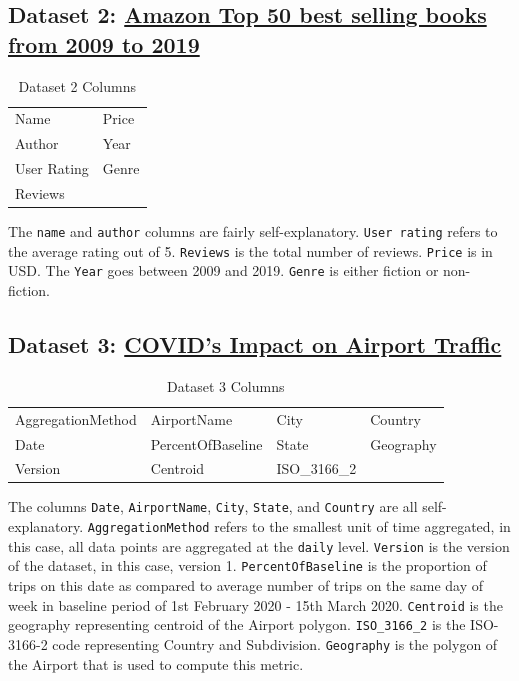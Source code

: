 \documentclass{article}
\begin{document}
\subsection{Dataset 2: \href{https://www.kaggle.com/sootersaalu/amazon-top-50-bestselling-books-2009-2019}{Amazon Top 50 best selling books from 2009 to 2019}}

\begin{table}[ht]
\centering
\begin{tabular}{@{}ll@{}}
\toprule
Name        & Price \\
Author      & Year  \\
User Rating & Genre \\
Reviews     &       \\ \bottomrule
\end{tabular}
\caption{Dataset 2 Columns}
\end{table}
The \texttt{name} and \texttt{author} columns are fairly self-explanatory. \texttt{User rating} refers to the average rating out of 5. \texttt{Reviews} is the total number of reviews. \texttt{Price} is in USD. The \texttt{Year} goes between 2009 and 2019. \texttt{Genre} is either fiction or non-fiction. 

\subsection{Dataset 3: \href{https://www.kaggle.com/terenceshin/covid19s-impact-on-airport-traffic}{COVID's Impact on Airport Traffic}}

\begin{table}[ht]
\centering
\begin{tabular}{@{}llll@{}}
\toprule
AggregationMethod & AirportName       & City         & Country   \\ 
Date              & PercentOfBaseline & State        & Geography \\
Version           & Centroid          & ISO\_3166\_2 &           \\ \bottomrule
\end{tabular}
\caption{Dataset 3 Columns}
\end{table}
The columns \texttt{Date}, \texttt{AirportName}, \texttt{City}, \texttt{State}, and \texttt{Country} are all self-explanatory. \texttt{AggregationMethod} refers to the smallest unit of time aggregated, in this case, all data points are aggregated at the \texttt{daily} level. \texttt{Version} is the version of the dataset, in this case, version 1. \texttt{PercentOfBaseline} is the proportion of trips on this date as compared to average number of trips on the same day of week in baseline period of 1st February 2020 - 15th March 2020. \texttt{Centroid} is the geography representing centroid of the Airport polygon. \texttt{ISO\_3166\_2} is the ISO-3166-2 code representing Country and Subdivision. \texttt{Geography} is the polygon of the Airport that is used to compute this metric.
\end{document}
